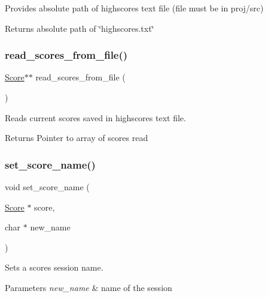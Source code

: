 Provides absolute path of highscores text file (file must be in proj/src) 

\begin{DoxyReturn}{Returns}
absolute path of \char`\"{}highscores.\+txt\char`\"{} 
\end{DoxyReturn}
\hypertarget{group__score_ga24850c38550bc5c6d3df0df15306a583}{}\label{group__score_ga24850c38550bc5c6d3df0df15306a583} 
\subsubsection{\texorpdfstring{read\+\_\+scores\+\_\+from\+\_\+file()}{read\_scores\_from\_file()}}
{\footnotesize\ttfamily \hyperlink{struct_score}{Score}$\ast$$\ast$ read\+\_\+scores\+\_\+from\+\_\+file (\begin{DoxyParamCaption}{ }\end{DoxyParamCaption})}



Reads current scores saved in highscores text file. 

\begin{DoxyReturn}{Returns}
Pointer to array of scores read 
\end{DoxyReturn}
\hypertarget{group__score_gae35db4ff67df11b097733c7d9dd5a40f}{}\label{group__score_gae35db4ff67df11b097733c7d9dd5a40f} 
\subsubsection{\texorpdfstring{set\+\_\+score\+\_\+name()}{set\_score\_name()}}
{\footnotesize\ttfamily void set\+\_\+score\+\_\+name (\begin{DoxyParamCaption}\item[{\hyperlink{struct_score}{Score} $\ast$}]{score,  }\item[{char $\ast$}]{new\+\_\+name }\end{DoxyParamCaption})}



Sets a score\textquotesingle{}s session name. 


\begin{DoxyParams}{Parameters}
{\em new\+\_\+name} & name of the session \\
\hline
\end{DoxyParams}
\hypertarget{group__score_gafda13bf491b8895de5356e2e8e9e0006}{}\label{group__score_gafda13bf491b8895de5356e2e8e9e0006} 
